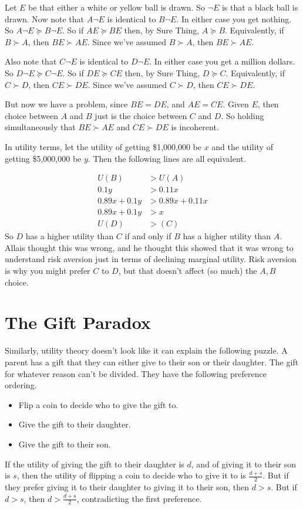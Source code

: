 Let $E$ be that either a white or yellow ball is drawn. So $\neg E$ is that a black ball is drawn. Now note that $A \neg E$ is identical to $B \neg E$. In either case you get nothing. So $A \neg E \succeq B \neg E$. So if $AE \succeq BE$ then, by Sure Thing, $A \succeq B$. Equivalently, if $B \succ A$, then $BE \succ AE$. Since we've assumed $B \succ A$, then $BE \succ AE$.

Also note that $C \neg E$ is identical to $D \neg E$. In either case you get a million dollars. So $D \neg E \succeq C \neg E$. So if $DE \succeq CE$ then, by Sure Thing, $D \succeq C$. Equivalently, if $C \succ D$, then $CE \succ DE$. Since we've assumed $C \succ D$, then $CE \succ DE$.

But now we have a problem, since $BE = DE$, and $AE = CE$. Given $E$, then choice between $A$ and $B$ just is the choice between $C$ and $D$. So holding simultaneously that $BE \succ AE$ and $CE \succ DE$ is incoherent.

In utility terms, let the utility of getting \$1,000,000 be $x$ and the utility of getting \$5,000,000 be $y$. Then the following lines are all equivalent.

\begin{align*}
U(B) &> U(A) \\
0.1y &> 0.11x \\
0.89x + 0.1y &> 0.89x + 0.11x \\
0.89x + 0.1y &> x \\
U(D) &> (C)
\end{align*}
So $D$ has a higher utility than $C$ if and only if $B$ has a higher utility than $A$. Allais thought this was wrong, and he thought this showed that it was wrong to understand risk aversion just in terms of declining marginal utility. Risk aversion is why you might prefer $C$ to $D$, but that doesn't affect (so much) the $A, B$ choice.

\section{The Gift Paradox}
Similarly, utility theory doesn't look like it can explain the following puzzle. A parent has a gift that they can either give to their son or their daughter. The gift for whatever reason can't be divided. They have the following preference ordering.

\begin{itemize}
\item Flip a coin to decide who to give the gift to.
\item Give the gift to their daughter.
\item Give the gift to their son.
\end{itemize}
If the utility of giving the gift to their daughter is $d$, and of giving it to their son is $s$, then the utility of flipping a coin to decide who to give it to is $\frac{d + s}{2}$. But if they prefer giving it to their daughter to giving it to their son, then $d > s$. But if $d > s$, then $d > \frac{d + s}{2}$, contradicting the first preference. 

